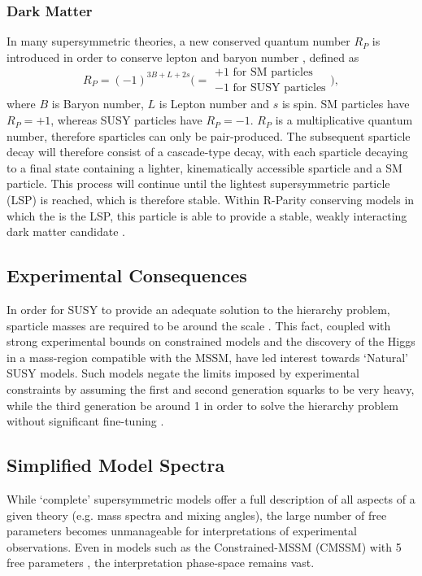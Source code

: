 \subsubsection{Dark Matter}
In many supersymmetric theories, a new conserved quantum number $R_P$
is introduced in order to conserve lepton and baryon number
\cite{Farrar1978575}, defined as
% 
\begin{equation}
R_P = (-1)^{3B+L+2s} \Bigg( =
\begin{array}{l} 
+1 \text{ for SM particles}\\ -1 \text{ for SUSY particles}
\end{array}\Bigg) ,
\end{equation}
% 
where $B$ is Baryon number, $L$ is Lepton number and $s$ is spin. SM particles
have $R_P = +1$, whereas SUSY particles have $R_P = -1$. $R_P$ is a
multiplicative quantum number, therefore sparticles
can only be pair-produced. The subsequent sparticle decay will therefore consist
of a cascade-type decay, with each sparticle decaying to a final state
containing a lighter, kinematically accessible sparticle and a SM particle.
This process will continue until the lightest supersymmetric particle (LSP) is
reached, which is therefore stable. Within R-Parity conserving models in which
the \chiz is the LSP, this particle is able to provide a stable, weakly
interacting dark matter candidate \cite{Jungman:1995df}.


\subsection{Experimental Consequences}
In order for SUSY to provide an adequate solution to the hierarchy problem,
sparticle masses are required to be around the \tev scale
\cite{ref:barbierinsusy,ref:hierarchy1,ref:hierarchy2}. This fact, coupled
with strong experimental bounds on constrained models and the discovery of
the Higgs in a mass-region compatible with the MSSM, have led interest
towards `Natural' SUSY models. Such models negate the limits imposed by
experimental constraints by assuming the first and second generation squarks to
be very heavy, while the third generation be around 1 \tev in order to solve
the hierarchy problem without significant fine-tuning
\cite{Carena:2008rt, Papucci:2011wy}.

\subsection{Simplified Model Spectra}
While `complete' supersymmetric models offer a full description of all
aspects of a given theory (e.g. mass spectra and mixing angles), the large
number of free parameters becomes unmanageable for interpretations
of experimental observations. Even in models such as the
Constrained-MSSM (CMSSM) with 5 free parameters
\cite{Kane:1993td, Ellis:2002rp}, the interpretation phase-space remains vast.

